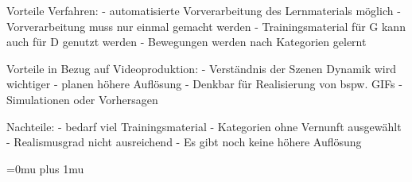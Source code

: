 \documentclass[times, 12pt,twocolumn]{article}
\begin{document}
 \label{sec:VondrickConclusion}

Vorteile Verfahren:
- automatisierte Vorverarbeitung des Lernmaterials möglich
- Vorverarbeitung muss nur einmal gemacht werden
- Trainingsmaterial für G kann auch für D genutzt werden
- Bewegungen werden nach Kategorien gelernt

Vorteile in Bezug auf Videoproduktion:
- Verständnis der Szenen Dynamik wird wichtiger
- planen höhere Auflösung
- Denkbar für Realisierung von bspw. GIFs
- Simulationen oder Vorhersagen 

Nachteile:
- bedarf viel Trainingsmaterial
- Kategorien ohne Vernunft ausgewählt
- Realismusgrad nicht ausreichend
- Es gibt noch keine höhere Auflösung




 \label{sec:Postroduktion}
 \label{sec:SOTAPostproduktion}

 \label{Zusammenfassung}




\Urlmuskip=0mu plus 1mu\relax %
 

\end{document}

